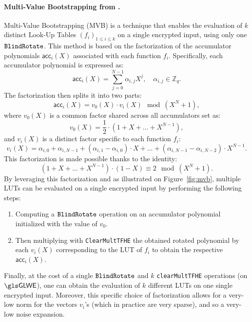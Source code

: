 \paragraph{Multi-Value Bootstrapping from \cite{RSA:CarIzaMol19}.}
\label{primitive:mvb}
%
Multi-Value Bootstrapping (MVB) is a technique that enables the evaluation of $k$ distinct Look-Up Tables $(f_i)_{1 \le i \le k}$ on a single encrypted input, using only one $\texttt{BlindRotate}$. This method is based on the factorization of the accumulator polynomials $\textsf{acc}_i(X)$ associated with each function $f_i$. Specifically, each accumulator polynomial is expressed as: 
$$
    \textsf{acc}_i(X) = \sum_{j=0}^{N-1} \alpha_{i,j} X^j, \quad \alpha_{i,j} \in \mathbb{Z}_q.
$$
The factorization then splits it into two parts: 
$$
    \textsf{acc}_i(X) = v_0(X) \cdot v_i(X) \mod (X^N + 1),
$$
where $v_0(X)$ is a common factor shared across all accumulators set as:
$$
    v_0(X) = \frac{1}{2} \cdot (1 + X + \dots + X^{N-1}),
$$
and $v_i(X)$ is a distinct factor specific to each function $f_i$:
$$
    v_i(X) = \alpha_{i, 0} + \alpha_{i, N-1} + (\alpha_{i, 1} - \alpha_{i, 0}) \cdot X + \dots + (\alpha_{i, N-1} - \alpha_{i, N-2}) \cdot X^{N-1}.
$$
This factorization is made possible thanks to the identity:
$$
(1 + X + \dots + X^{N-1}) \cdot (1-X) \equiv 2 \mod (X^N + 1).
$$
By leveraging this factorization and as illustrated on Figure~\ref{fig:mvb}, multiple LUTs can be evaluated on a single encrypted input by performing the following steps:
\begin{enumerate}
\item Computing a $\texttt{BlindRotate}$ operation on an accumulator polynomial initialized with the value of $v_0$.
\item Then multiplying with \texttt{ClearMultTFHE} the obtained rotated polynomial by each $v_i(X)$ corresponding to the \gls{LUT} of $f_i$ to obtain the respective $\textsf{acc}_i(X)$.
\end{enumerate}
Finally, at the cost of a single $\texttt{BlindRotate}$ and $k$ \texttt{clearMultTFHE} operations (on $\GLWE$), one can obtain the evaluation of $k$ different LUTs on one single encrypted input. Moreover, this specific choice of factorization allows for a very-low norm for the vectors $v_i$'s (which in practice are very sparse), and so a very-low noise expansion.

